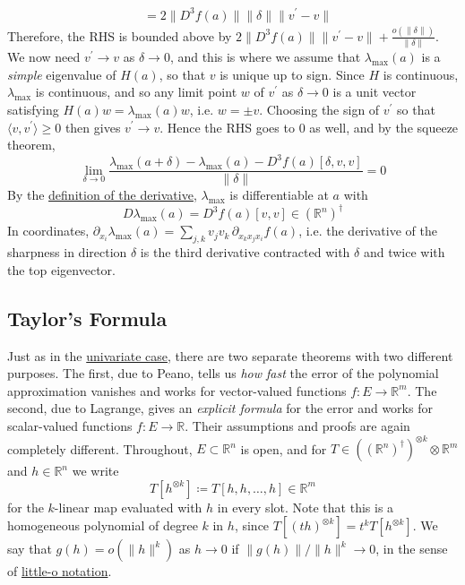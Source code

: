 \begin{example}
\begin{align}
			& = 2 \|D^3 f(a)\| \|\delta\| \|v^\prime - v\|
		\end{align}
		Therefore, the RHS is bounded above by $2 \|D^3 f(a)\| \|v^\prime - v\| + \frac{o(\|\delta\|)}{\|\delta\|}$. We now need $v^\prime \to v$ as $\delta \to 0$, and this is where we assume that $\lambda_{\max}(a)$ is a \textit{simple} eigenvalue of $H(a)$, so that $v$ is unique up to sign. Since $H$ is continuous, $\lambda_{\max}$ is continuous, and so any limit point $w$ of $v^\prime$ as $\delta \to 0$ is a unit vector satisfying $H(a) w = \lambda_{\max}(a) w$, i.e. $w = \pm v$. Choosing the sign of $v^\prime$ so that $\langle v, v^\prime \rangle \geq 0$ then gives $v^\prime \to v$. Hence the RHS goes to $0$ as well, and by the squeeze theorem, 
		\begin{equation}
			\lim_{\delta \to 0} \frac{\lambda_{\max} (a + \delta) - \lambda_{\max} (a) - D^3 f(a)[\delta, v, v]}{\|\delta\|} = 0
		\end{equation}
		By the \hyperref[def:derivative]{definition of the derivative}, $\lambda_{\max}$ is differentiable at $a$ with 
		\begin{equation}
			D\lambda_{\max}(a) = D^3 f(a)[v, v] \in (\mathbb{R}^n)^\dagger
		\end{equation}
		In coordinates, $\partial_{x_i} \lambda_{\max}(a) = \sum_{j, k} v_j v_k \, \partial_{x_k x_j x_i} f(a)$, i.e. the derivative of the sharpness in direction $\delta$ is the third derivative contracted with $\delta$ and twice with the top eigenvector. 
	\end{example}

\subsection{Taylor's Formula}

  Just as in the \hyperref[real-thm:taylor-peano]{univariate case}, there are two separate theorems with two different purposes. The first, due to Peano, tells us \textit{how fast} the error of the polynomial approximation vanishes and works for vector-valued functions $f: E \to \mathbb{R}^m$. The second, due to Lagrange, gives an \textit{explicit formula} for the error and works for scalar-valued functions $f: E \to \mathbb{R}$. Their assumptions and proofs are again completely different. Throughout, $E \subset \mathbb{R}^n$ is open, and for $T \in ((\mathbb{R}^n)^\dagger)^{\otimes k} \otimes \mathbb{R}^m$ and $h \in \mathbb{R}^n$ we write
  \begin{equation}
    T [h^{\otimes k}] \coloneqq T[h, h, \ldots, h] \in \mathbb{R}^m
  \end{equation}
  for the $k$-linear map evaluated with $h$ in every slot. Note that this is a homogeneous polynomial of degree $k$ in $h$, since $T[(th)^{\otimes k}] = t^k T[h^{\otimes k}]$. We say that $g(h) = o(\|h\|^k)$ as $h \to 0$ if $\|g(h)\| / \|h\|^k \to 0$, in the sense of \hyperref[real-def:little-o-notation]{little-o notation}. 

